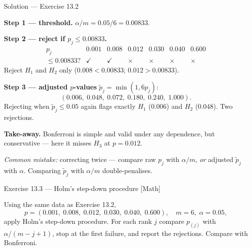 \documentclass[aspectratio=169,11pt]{beamer}
\begin{document}
\begin{frame}{Solution --- Exercise 13.2}
\begin{solutionbox}
  \scriptsize
  \textbf{Step 1 --- threshold.}
  $\alpha / m = 0.05 / 6 = 0.00833$.

  \medskip
  \textbf{Step 2 --- reject if $p_j \le 0.00833$.}
  \[
    \begin{array}{l|cccccc}
      p_j        & 0.001 & 0.008 & 0.012 & 0.030 & 0.040 & 0.600 \\ \hline
      \le 0.00833? & \checkmark & \checkmark & \times & \times & \times & \times
    \end{array}
  \]
  Reject $H_1$ and $H_2$ only ($0.008 < 0.00833$; $0.012 > 0.00833$).

  \medskip
  \textbf{Step 3 --- adjusted $p$-values} $\tilde p_j = \min(1, 6 p_j)$:
  \[
    (0.006,\; 0.048,\; 0.072,\; 0.180,\; 0.240,\; 1.000).
  \]
  Rejecting when $\tilde p_j \le 0.05$ again flags exactly $H_1$
  ($0.006$) and $H_2$ ($0.048$). Two rejections.

  \medskip
  \textbf{Take-away.} Bonferroni is simple and valid under any
  dependence, but conservative --- here it misses $H_3$ at $p = 0.012$.

  \medskip
  \textit{Common mistake:} correcting twice --- compare raw $p_j$ with
  $\alpha/m$, \emph{or} adjusted $\tilde p_j$ with $\alpha$. Comparing
  $\tilde p_j$ with $\alpha/m$ double-penalises.
\end{solutionbox}
\end{frame}

\begin{frame}{Exercise 13.3 --- Holm's step-down procedure [Math]}
\begin{exercise}
  Using the same data as Exercise 13.2,
  \[
    p = (0.001,\; 0.008,\; 0.012,\; 0.030,\; 0.040,\; 0.600),
    \quad m = 6,\; \alpha = 0.05 ,
  \]
  apply Holm's step-down procedure. For each rank $j$ compare
  $p_{(j)}$ with $\alpha / (m - j + 1)$, stop at the first failure,
  and report the rejections. Compare with Bonferroni.
\end{exercise}
\end{frame}
\end{document}
